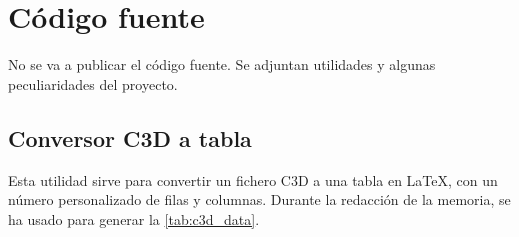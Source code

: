 \chapter{Código fuente}
\noindent No se va a publicar el código fuente. Se adjuntan utilidades y algunas peculiaridades del proyecto.

\section{Conversor C3D a tabla} \label{apx:c3d_latex_py}

Esta utilidad sirve para convertir un fichero C3D a una tabla en \LaTeX, con un número personalizado de filas y columnas. Durante la redacción de la memoria, se ha usado para generar la \autoref{tab:c3d_data}.

